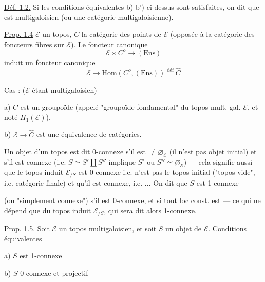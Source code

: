 \uline{Déf. 1.2.} Si les conditions équivalentes b) b') ci-dessus
sont satisfaites, on dit que 
est   
multigaloisien (ou une \uline{catégorie} multigaloisienne).

\uline{Prop. 1.4}  \(\mathcal E\) un topos,
\(C\) la catégorie des points de \(\mathcal E\) (opposée à la
catégorie des foncteurs fibres sur \(\mathcal E\)). Le foncteur
canonique
\[
\mathcal E\times C^o\longrightarrow(\mathrm{Ens})
\]
induit un foncteur canonique
\[
\mathcal E\longrightarrow\mathrm{Hom}(C^o,(\mathrm{Ens}))
\overset{\mathrm{déf}}{=}\widehat C
\]

Cas  : (\(\mathcal E\) étant multigaloisien)

a) \(C\) est un groupoïde (appelé "groupoïde fondamental" du topos
mult. gal. \(\mathcal E\), et  noté
\(\Pi_1(\mathcal E)\)).

b) \(\mathcal E\longrightarrow\widehat C\) est une équivalence
de catégories.

Un objet  d'un topos 
est dit 0-connexe s'il est \(\ne\varnothing_{\mathcal E}\)
(il n'est pas objet initial) et s'il est connexe
(i.e. \(S\simeq S'\amalg S''\) implique
\(S'\) ou \(S''\simeq\varnothing_{\mathcal E}\)) --- cela signifie
aussi que le topos induit \(\mathcal E_{/S}\) est 0-connexe
i.e. n'est pas le topos initial ("topos vide", i.e.
 catégorie finale) et qu'il est connexe,
i.e. ... On dit que \(S\) est 1-connexe

(ou "simplement connexe") s'il est 0-connexe, et si tout
loc const.  est 
--- ce qui ne dépend  que du topos induit
\(\mathcal E_{/S}\), qui sera dit alors 1-connexe.

\uline{Prop.} 1.5. Soit \(\mathcal E\) un topos multigaloisien,
et soit \(S\) un objet de \(\mathcal E\). Conditions équivalentes

a) \(S\) est 1-connexe

b) \(S\)  0-connexe et projectif

